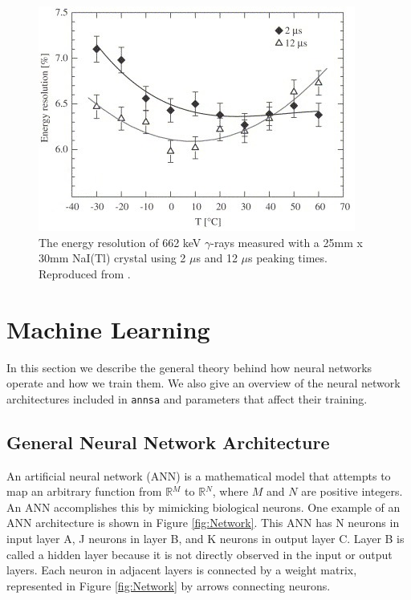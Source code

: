 \begin{figure}[H]
\centering
\includegraphics[width=0.95\linewidth]{images/temp-dependence-resolution-moszynski}
\caption{The energy resolution of 662 keV $\gamma$-rays measured with a 25mm x 30mm NaI(Tl) crystal using 2 $\mu$s and 12 $\mu$s peaking times. Reproduced from \cite{MOSZYNSKI2006739}.}
\label{fig:temp-dependence-resolution-moszynski}
\end{figure}

\section{Machine Learning}

In this section we describe the general theory behind how neural networks operate and how we train them. We also give an overview of the neural network architectures included in \verb|annsa| and parameters that affect their training.

\subsection{General Neural Network Architecture}

An artificial neural network (ANN) is a mathematical model that attempts to map an arbitrary function from $\mathbb{R}{^M}$ to $\mathbb{R}{^N}$, where $M$ and $N$ are positive integers. An ANN accomplishes this by mimicking biological neurons. One example of an ANN architecture is shown in Figure \ref{fig:Network}. This ANN has N neurons in input layer A, J neurons in layer B, and K neurons in output layer C. Layer B is called a hidden layer because it is not directly observed in the input or output layers. Each neuron in adjacent layers is connected by a weight matrix, represented in Figure \ref{fig:Network} by arrows connecting neurons.


